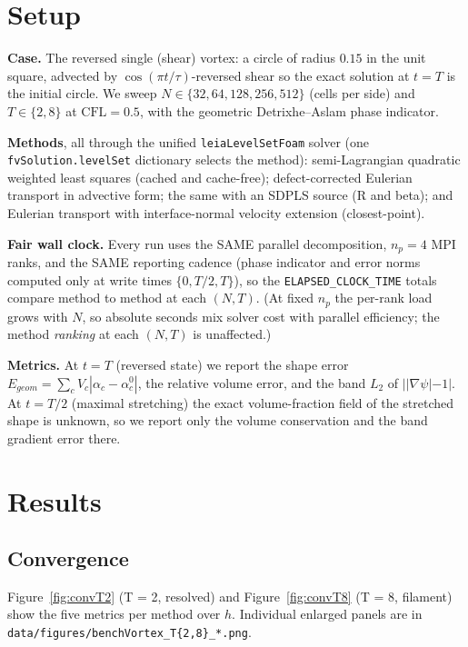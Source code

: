 \documentclass[preprint,3p,11pt]{elsarticle}
\newcommand{\psilev}{\psi}
\begin{document}
\section{Setup}
\textbf{Case.} The reversed single (shear) vortex: a circle of radius $0.15$
in the unit square, advected by $\cos(\pi t/\tau)$-reversed shear so the
exact solution at $t = T$ is the initial circle. We sweep
$N \in \{32, 64, 128, 256, 512\}$ (cells per side) and $T \in \{2, 8\}$ at
$\mathrm{CFL} = 0.5$, with the geometric Detrixhe--Aslam phase indicator.

\textbf{Methods}, all through the unified \texttt{leiaLevelSetFoam} solver
(one \texttt{fvSolution.levelSet} dictionary selects the method):
semi-Lagrangian quadratic weighted least squares (cached and cache-free);
defect-corrected Eulerian transport in advective form; the same with an
SDPLS source (R and beta); and Eulerian transport with interface-normal
velocity extension (closest-point).

\textbf{Fair wall clock.} Every run uses the SAME parallel decomposition,
$n_p = 4$ MPI ranks, and the SAME reporting cadence (phase indicator and
error norms computed only at write times $\{0, T/2, T\}$), so the
\texttt{ELAPSED\_CLOCK\_TIME} totals compare method to method at each
$(N, T)$. (At fixed $n_p$ the per-rank load grows with $N$, so absolute
seconds mix solver cost with parallel efficiency; the method \emph{ranking}
at each $(N,T)$ is unaffected.)

\textbf{Metrics.} At $t = T$ (reversed state) we report the shape error
$E_{geom} = \sum_c V_c|\alpha_c - \alpha_c^0|$, the relative volume error,
and the band $L_2$ of $||\nabla\psilev|-1|$. At $t = T/2$ (maximal
stretching) the exact volume-fraction field of the stretched shape is
unknown, so we report only the volume conservation and the band gradient
error there.

\section{Results}
\subsection{Convergence}
Figure~\ref{fig:convT2} (T = 2, resolved) and Figure~\ref{fig:convT8}
(T = 8, filament) show the five metrics per method over $h$. Individual
enlarged panels are in \texttt{data/figures/benchVortex\_T\{2,8\}\_*.png}.
\end{document}
